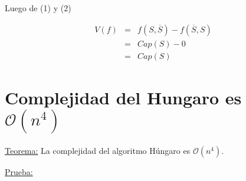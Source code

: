 \documentclass[12pt,a4paper]{report}
\begin{document}
			Luego de (1) y (2)
			
			\begin{eqnarray}
				\nonumber V(f) &=& f(S, \overline{S}) - f(\overline{S}, S)\\
				\nonumber &=& Cap(S) - 0 \\
				\nonumber &=& Cap(S)				
			\end{eqnarray}

	\section{Complejidad del Hungaro es $\mathcal{O}(n^{4})$}
	
		\underline{Teorema:} La complejidad del algoritmo Húngaro es $\mathcal{O}(n^{4})$.
		
		\underline{Prueba:} 
		
\end{document}
